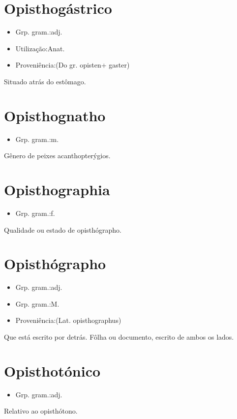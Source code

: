\section{Opisthogástrico}
\begin{itemize}
\item {Grp. gram.:adj.}
\end{itemize}
\begin{itemize}
\item {Utilização:Anat.}
\end{itemize}
\begin{itemize}
\item {Proveniência:(Do gr. \textunderscore opisten\textunderscore  + \textunderscore gaster\textunderscore )}
\end{itemize}
Situado atrás do estômago.
\section{Opisthognatho}
\begin{itemize}
\item {Grp. gram.:m.}
\end{itemize}
Gênero de peixes acanthopterýgios.
\section{Opisthographia}
\begin{itemize}
\item {Grp. gram.:f.}
\end{itemize}
Qualidade ou estado de opisthógrapho.
\section{Opisthógrapho}
\begin{itemize}
\item {Grp. gram.:adj.}
\end{itemize}
\begin{itemize}
\item {Grp. gram.:M.}
\end{itemize}
\begin{itemize}
\item {Proveniência:(Lat. \textunderscore opisthographus\textunderscore )}
\end{itemize}
Que está escrito por detrás.
Fôlha ou documento, escrito de ambos os lados.
\section{Opisthotónico}
\begin{itemize}
\item {Grp. gram.:adj.}
\end{itemize}
Relativo ao opisthótono.
